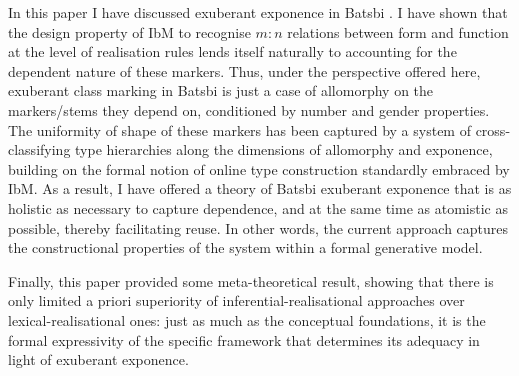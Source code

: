 \documentclass[output=paper]{langsci/langscibook}
\begin{document}
In this paper I have discussed exuberant exponence in Batsbi
\citep{Harris09}. I have shown that the design property of IbM to
recognise $m:n$ relations between form and function at the level of
realisation rules lends itself naturally to accounting for the dependent
nature of these markers. Thus, under the perspective offered here,
exuberant class marking in Batsbi is just a case of allomorphy on the
markers/stems they depend on, conditioned by number and gender
properties. The uniformity of shape of these markers has been captured
by a system of cross-classifying type hierarchies along the dimensions
of allomorphy and exponence, building on the formal notion of online
type construction \citep{Koenig94} standardly embraced by IbM. As a
result, I have offered a theory of Batsbi exuberant exponence that is
as holistic as necessary to capture dependence, and at the same time as
atomistic as possible, thereby facilitating reuse. In other words, the
current approach captures the constructional properties of the system
within a formal generative model. 

  
  
  
  
  

Finally, this paper provided some meta-theoretical result, showing
that there is only limited a priori superiority of
inferential-realisational approaches over lexical-realisational ones:
just as much as the conceptual foundations, it is the formal
expressivity of the specific framework that determines its adequacy in
light of exuberant exponence.
\end{document}
